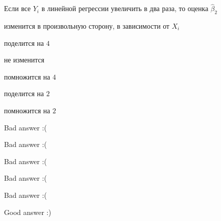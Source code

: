 
\begin{question}
Если все \(Y_i\) в линейной регрессии увеличить в два раза, то оценка \(\hat\beta_2\)
\begin{answerlist}
  \item изменится в произвольную сторону, в зависимости от \(X_i\)
  \item поделится на \(4\)
  \item не изменится
  \item помножится на \(4\)
  \item поделится на \(2\)
  \item помножится на \(2\)
\end{answerlist}
\end{question}

\begin{solution}
\begin{answerlist}
  \item Bad answer :(
  \item Bad answer :(
  \item Bad answer :(
  \item Bad answer :(
  \item Bad answer :(
  \item Good answer :)
\end{answerlist}
\end{solution}

